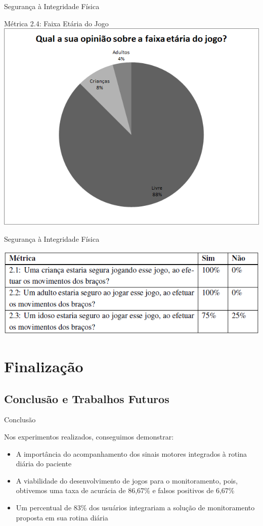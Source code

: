 \documentclass{beamer}
\begin{document}
\begin{frame}{Segurança à Integridade Física} 
    \begin{block}{Métrica 2.4: Faixa Etária do Jogo}
			\center \includegraphics[height=2.4 in]{img/chart_10-.png}
    \end{block}
\end{frame}

\begin{frame}{Segurança à Integridade Física} 
    \begin{block}{}
			\center \includegraphics[height=1.4 in]{img/metricasq2.png}
    \end{block}
\end{frame}


\section{Finalização}
\subsection{Conclusão e Trabalhos Futuros}

\begin{frame}{Conclusão}
\begin{block}{}
Nos experimentos realizados, conseguimos demonstrar:
  \begin{itemize}
   \item A importância do acompanhamento dos sinais motores integrados à rotina diária do paciente
   \item A viabilidade do desenvolvimento de jogos para o monitoramento, pois, obtivemos uma taxa de acurácia de 86,67\% e falsos positivos de 6,67\%
   \item Um percentual de 83\% dos usuários integrariam a solução de monitoramento proposta em sua rotina diária
  \end{itemize}
\end{block}
\end{frame}
\end{document}
